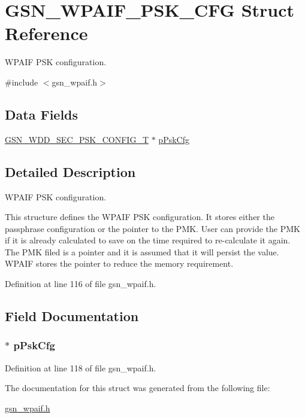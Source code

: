 \hypertarget{a00425}{
\section{GSN\_\-WPAIF\_\-PSK\_\-CFG Struct Reference}
\label{a00425}
}


WPAIF PSK configuration.  




{\ttfamily \#include $<$gsn\_\-wpaif.h$>$}

\subsection*{Data Fields}
\begin{DoxyCompactItemize}
\item 
\hyperlink{a00294}{GSN\_\-WDD\_\-SEC\_\-PSK\_\-CONFIG\_\-T} $\ast$ \hyperlink{a00425_a7efcccc4d127541cb324b26ec4a7520e}{pPskCfg}
\end{DoxyCompactItemize}


\subsection{Detailed Description}
WPAIF PSK configuration. 

This structure defines the WPAIF PSK configuration. It stores either the passphrase configuration or the pointer to the PMK. User can provide the PMK if it is already calculated to save on the time required to re-\/calculate it again. The PMK filed is a pointer and it is assumed that it will persist the value. WPAIF stores the pointer to reduce the memory requirement. 

Definition at line 116 of file gsn\_\-wpaif.h.



\subsection{Field Documentation}
\hypertarget{a00425_a7efcccc4d127541cb324b26ec4a7520e}{
\subsubsection[{pPskCfg}]{$\ast$ {\bf pPskCfg}}}
\label{a00425_a7efcccc4d127541cb324b26ec4a7520e}


Definition at line 118 of file gsn\_\-wpaif.h.



The documentation for this struct was generated from the following file:\begin{DoxyCompactItemize}
\item 
\hyperlink{a00615}{gsn\_\-wpaif.h}\end{DoxyCompactItemize}
